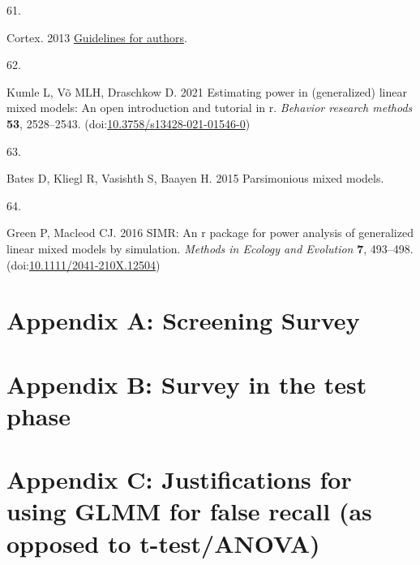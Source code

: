 \documentclass[
]{article}
\newlength{\cslhangindent}
\newlength{\csllabelwidth}
\newlength{\cslentryspacingunit} %
\newenvironment{CSLReferences}[2] %
 {%
  \setlength{\parindent}{0pt}
  \ifodd #1
  \let\oldpar\par
  \def\par{\hangindent=\cslhangindent\oldpar}
  \fi
  \setlength{\parskip}{#2\cslentryspacingunit}
 }%
 {}
\newcommand{\CSLLeftMargin}[1]{\parbox[t]{\csllabelwidth}{#1}}
\newcommand{\CSLRightInline}[1]{\parbox[t]{\linewidth - \csllabelwidth}{#1}\break}
\begin{document}
\begin{CSLReferences}{0}{0}
\leavevmode{}%
\CSLLeftMargin{61. }%
\CSLRightInline{Cortex. 2013 \href{https://www.elsevier.com/__data/promis_misc/PROMIS\%20pub_idt_CORTEX\%20Guidelines_RR_29_04_2013.pdf}{Guidelines for authors}. }

\leavevmode{}%
\CSLLeftMargin{62. }%
\CSLRightInline{Kumle L, Võ MLH, Draschkow D. 2021 Estimating power in (generalized) linear mixed models: An open introduction and tutorial in r. \emph{Behavior research methods} \textbf{53}, 2528--2543. (doi:\href{https://doi.org/10.3758/s13428-021-01546-0}{10.3758/s13428-021-01546-0})}

\leavevmode{}%
\CSLLeftMargin{63. }%
\CSLRightInline{Bates D, Kliegl R, Vasishth S, Baayen H. 2015 Parsimonious mixed models. }

\leavevmode{}%
\CSLLeftMargin{64. }%
\CSLRightInline{Green P, Macleod CJ. 2016 SIMR: An r package for power analysis of generalized linear mixed models by simulation. \emph{Methods in Ecology and Evolution} \textbf{7}, 493--498. (doi:\href{https://doi.org/10.1111/2041-210X.12504}{10.1111/2041-210X.12504})}

\end{CSLReferences}

\hypertarget{appendix-a-screening-survey}{%
\section*{Appendix A: Screening Survey}\label{appendix-a-screening-survey}}

\hypertarget{appendix-b-survey-in-the-test-phase}{%
\section*{Appendix B: Survey in the test phase}\label{appendix-b-survey-in-the-test-phase}}

\hypertarget{appendix-c-justifications-for-using-glmm-for-false-recall-as-opposed-to-t-testanova}{%
\section*{Appendix C: Justifications for using GLMM for false recall (as opposed to t-test/ANOVA)}\label{appendix-c-justifications-for-using-glmm-for-false-recall-as-opposed-to-t-testanova}}
\end{document}
